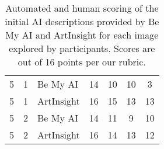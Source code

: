 \documentclass[sigconf]{acmart}
\begin{document}
\begin{table*}[h]
{\begin{tabular}{cclcccc}
5 & 1 & Be My AI & 14 & 10 & 10 & 3 \\
5 & 1 & ArtInsight & 16 & 15 & 13 & 13 \\
5 & 2 & Be My AI & 14 & 11 & 9 & 10 \\
5 & 2 & ArtInsight & 16 & 14 & 13 & 12 \\

\bottomrule
\end{tabular}
}
\vspace{0.5em}
\caption{Automated and human scoring of the initial AI descriptions provided by Be My AI and ArtInsight for each image explored by participants. Scores are out of 16 points per our rubric.}
\label{Scoring}
\vspace{-1em}
\end{table*}

\end{document}
